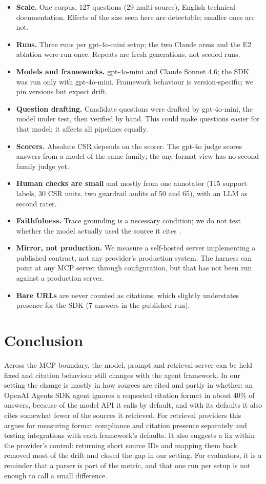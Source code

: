 \documentclass[11pt]{article}
\begin{document}
\begin{itemize}
\item \textbf{Scale.} One corpus, 127 questions (29 multi-source), English technical documentation.
Effects of the size seen here are detectable; smaller ones are not.
\item \textbf{Runs.} Three runs per gpt-4o-mini setup; the two Claude arms and the E2 ablation
were run once. Repeats are fresh generations, not seeded runs.
\item \textbf{Models and frameworks.} gpt-4o-mini and Claude Sonnet 4.6; the SDK was run only with
gpt-4o-mini. Framework behaviour is version-specific; we pin versions but expect drift.
\item \textbf{Question drafting.} Candidate questions were drafted by gpt-4o-mini, the model under
test, then verified by hand. This could make questions easier for that model; it affects all
pipelines equally.
\item \textbf{Scorers.} Absolute CSR depends on the scorer. The gpt-4o judge scores answers from a
model of the same family; the any-format view has no second-family judge yet.
\item \textbf{Human checks are small} and mostly from one annotator (115 support labels, 30 CSR
units, two guardrail audits of 50 and 65), with an LLM as second rater.
\item \textbf{Faithfulness.} Trace grounding is a necessary condition; we do not test whether the
model actually used the source it cites \citep{wallat2025correctness}.
\item \textbf{Mirror, not production.} We measure a self-hosted server implementing a published
contract, not any provider's production system. The harness can point at any MCP server through
configuration, but that has not been run against a production server.
\item \textbf{Bare URLs} are never counted as citations, which slightly understates presence for
the SDK (7 answers in the published run).
\end{itemize}

\section{Conclusion}

Across the MCP boundary, the model, prompt and retrieval server can be held fixed and citation
behaviour still changes with the agent framework. In our setting the change is mostly in how
sources are cited and partly in whether: an OpenAI Agents SDK agent ignores a requested citation
format in about 40\% of answers, because of the model API it calls by default, and with its
defaults it also cites somewhat fewer of the sources it retrieved. For retrieval providers this
argues for measuring format compliance and citation presence separately and testing integrations
with each framework's defaults. It also suggests a fix within the provider's control: returning
short source IDs and mapping them back removed most of the drift and closed the gap in our
setting. For evaluators, it is a reminder that a parser is part of the metric, and that one run
per setup is not enough to call a small difference.
\end{document}
